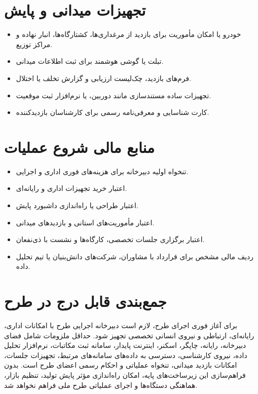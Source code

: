 \documentclass[12pt,a4paper]{report}
\begin{document}
\section{تجهیزات میدانی و پایش}
\begin{itemize}
    \item خودرو یا امکان مأموریت برای بازدید از مرغداری‌ها، کشتارگاه‌ها، انبار نهاده و مراکز توزیع.
    \item تبلت یا گوشی هوشمند برای ثبت اطلاعات میدانی.
    \item فرم‌های بازدید، چک‌لیست ارزیابی و گزارش تخلف یا اختلال.
    \item تجهیزات ساده مستندسازی مانند دوربین،  یا نرم‌افزار ثبت موقعیت.
    \item کارت شناسایی و معرفی‌نامه رسمی برای کارشناسان بازدیدکننده.
\end{itemize}

\section{منابع مالی شروع عملیات}
\begin{itemize}
    \item تنخواه اولیه دبیرخانه برای هزینه‌های فوری اداری و اجرایی.
    \item اعتبار خرید تجهیزات اداری و رایانه‌ای.
    \item اعتبار طراحی یا راه‌اندازی داشبورد پایش.
    \item اعتبار مأموریت‌های استانی و بازدیدهای میدانی.
    \item اعتبار برگزاری جلسات تخصصی، کارگاه‌ها و نشست با ذی‌نفعان.
    \item ردیف مالی مشخص برای قرارداد با مشاوران، شرکت‌های دانش‌بنیان یا تیم تحلیل داده.
\end{itemize}

\section*{جمع‌بندی قابل درج در طرح}
برای آغاز فوری اجرای طرح، لازم است دبیرخانه اجرایی طرح با امکانات اداری، رایانه‌ای، ارتباطی و نیروی انسانی تخصصی تجهیز شود. حداقل ملزومات شامل فضای دبیرخانه، رایانه، چاپگر، اسکنر، اینترنت پایدار، سامانه ثبت مکاتبات، نرم‌افزار تحلیل داده، نیروی کارشناسی، دسترسی به داده‌های سامانه‌های مرتبط، تجهیزات جلسات، امکانات بازدید میدانی، تنخواه عملیاتی و احکام رسمی اعضای طرح است. بدون فراهم‌سازی این زیرساخت‌های پایه، امکان راه‌اندازی مؤثر پایش تولید، تنظیم بازار، هماهنگی دستگاه‌ها و اجرای عملیاتی طرح ملی فراهم نخواهد شد.
\end{document}

